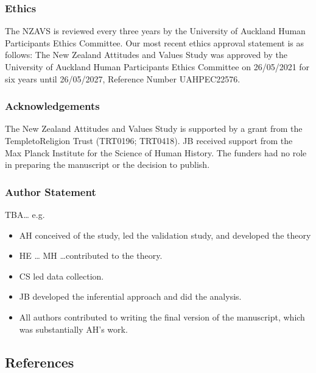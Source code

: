\documentclass[
  singlecolumn]{article}
\providecommand{\tightlist}{%
  \setlength{\itemsep}{0pt}\setlength{\parskip}{0pt}}\usepackage{longtable,booktabs,array}
\begin{document}
\newpage{}

\subsubsection{Ethics}\label{ethics}

The NZAVS is reviewed every three years by the University of Auckland
Human Participants Ethics Committee. Our most recent ethics approval
statement is as follows: The New Zealand Attitudes and Values Study was
approved by the University of Auckland Human Participants Ethics
Committee on 26/05/2021 for six years until 26/05/2027, Reference Number
UAHPEC22576.

\subsubsection{Acknowledgements}\label{acknowledgements}

The New Zealand Attitudes and Values Study is supported by a grant from
the TempletoReligion Trust (TRT0196; TRT0418). JB received support from
the Max Planck Institute for the Science of Human History. The funders
had no role in preparing the manuscript or the decision to publish.

\subsubsection{Author Statement}\label{author-statement}

TBA\ldots{} e.g.~

\begin{itemize}
\tightlist
\item
  AH conceived of the study, led the validation study, and developed the
  theory
\item
  HE \ldots{} MH \ldots contributed to the theory.
\item
  CS led data collection.
\item
  JB developed the inferential approach and did the analysis.\\
\item
  All authors contributed to writing the final version of the
  manuscript, which was substantially AH's work.
\end{itemize}

\newpage{}

\subsection{References}\label{references}
\end{document}
